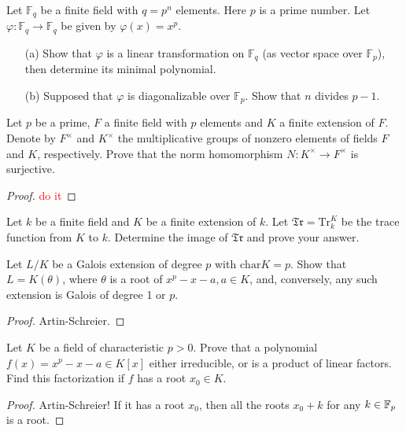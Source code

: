 \begin{prob}[F2010-Q5]
    Let \(\mathbb{F}_q\) be a finite field with \(q = p^n\) elements. Here \(p\) is a prime number. Let \(\varphi : \mathbb{F}_q \rightarrow \mathbb{F}_q\) be given by \(\varphi(x) = x^p\).
    \begin{itemize}
        \item[(a)] Show that \(\varphi\) is a linear transformation on \(\mathbb{F}_q\) (as vector space over \(\mathbb{F}_p\)), then determine its minimal polynomial.
        \item[(b)] Supposed that \(\varphi\) is diagonalizable over \(\mathbb{F}_p\). Show that \(n\) divides \(p - 1\).
    \end{itemize}
\end{prob}






\begin{prob}[S2011-Q2]
    Let \(p\) be a prime, \(F\) a finite field with \(p\) elements and \(K\) a finite extension of \(F\). Denote by \(F^\times\) and \(K^\times\) the multiplicative groups of nonzero elements of fields \(F\) and \(K\), respectively. Prove that the norm homomorphism \(N:K^\times\to F^\times\) is surjective.
\end{prob}
\begin{proof}
    \textcolor{red}{do it}
\end{proof}



\begin{prob}[F2008-Q3]
    Let \(k\) be a finite field and \(K\) be a finite extension of \(k\). Let \(\mathfrak{Tr} = \text{Tr}_k^K\) be the trace function from \(K\) to \(k\). Determine the image of \(\mathfrak{Tr}\) and prove your answer.
\end{prob}



\begin{prob}[S2014-Q3]
    Let \(L/K\) be a Galois extension of degree \(p\) with \(\text{char}K=p\). Show that \(L=K(\theta)\), where \(\theta\) is a root of \(x^{p}-x-a,a\in K\), and, conversely, any such extension is Galois of degree 1 or \(p\).
\end{prob}
\begin{proof}
    Artin-Schreier.
\end{proof}


\begin{prob}[S2015-Q1]
    Let \(K\) be a field of characteristic \(p>0\). Prove that a polynomial \(f(x)=x^{p}-x-a\in K[x]\) either irreducible, or is a product of linear factors. Find this factorization if \(f\) has a root \(x_{0}\in K\).
\end{prob}
\begin{proof}
    Artin-Schreier! If it has a root $x_0$, then all the roots $x_0+k$ for any $k\in\mathbb{F}_p$ is a root. 
\end{proof}


